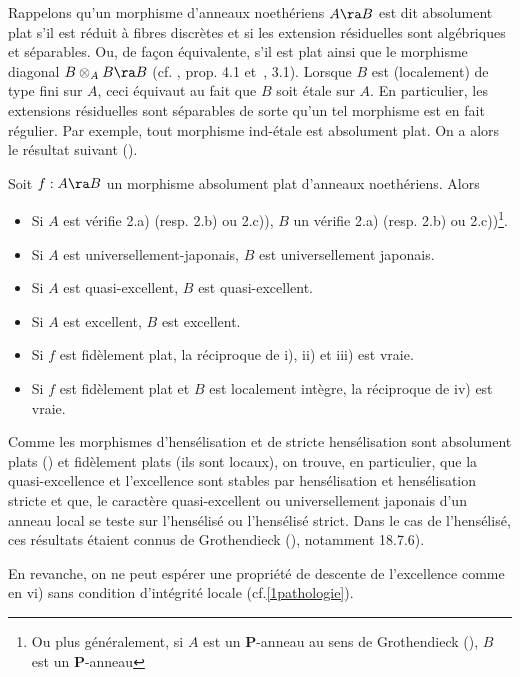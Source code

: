 \documentclass[10pt]{../fichiers-configuration-latex/smfart}
\begin{document}
Rappelons qu'un morphisme d'anneaux noethériens $A\ra B$ est dit absolument plat s'il est réduit à
fibres discrètes et si les extension résiduelles sont algébriques et séparables. Ou, de façon
équivalente, s'il est plat ainsi que le morphisme diagonal $B\otimes_AB\ra B$ (cf. \cite{Fer72},
prop. 4.1 et~\cite{Oli71}, 3.1). Lorsque $B$ est (localement) de type fini sur $A$, ceci équivaut au
fait que $B$ soit étale sur $A$. En particulier, les extensions résiduelles sont séparables de sorte
qu'un tel morphisme est en fait régulier. Par exemple, tout morphisme ind-étale est absolument plat.
On a alors le résultat suivant (\cite{Gre76}).


\begin{theoreme}\label{1th-greco} Soit $f:A\ra B$ un morphisme absolument plat d'anneaux
noethériens.  Alors \begin{itemize} \item[i)] Si $A$ est vérifie 2.a) (resp.  2.b) ou 2.c)), $B$ un
vérifie 2.a) (resp.  2.b) ou 2.c))\footnote{Ou plus généralement, si $A$ est un $\mathbf{P}$-anneau
au sens de Grothendieck (), $B$ est un $\mathbf{P}$-anneau}.  \item[ii)] Si $A$ est
universellement-japonais, $B$ est universellement japonais.  \item[iii)] Si $A$ est quasi-excellent,
$B$ est quasi-excellent.  \item[iv)] Si $A$ est excellent, $B$ est excellent.  \item[v)] Si $f$ est
fidèlement plat, la réciproque de i), ii) et iii) est vraie.  \item[vi)] Si $f$ est  fidèlement plat
et $B$ est localement intègre, la réciproque de iv) est vraie.  \end{itemize} \end{theoreme}


Comme les morphismes d'hensélisation et de stricte hensélisation sont absolument plats
() et fidèlement plats (ils sont locaux), on trouve, en particulier,
que la quasi-excellence et l'excellence sont stables par hensélisation et hensélisation stricte et
que, le caractère quasi-excellent ou universellement japonais d'un anneau local se teste sur
l'hensélisé ou l'hensélisé strict. Dans le cas de l'hensélisé, ces résultats étaient connus de
Grothendieck (), notamment 18.7.6).

En revanche, on ne peut espérer une propriété de descente de l'excellence comme en vi) sans
condition d'intégrité locale (cf.\ref{1pathologie}).
\end{document}
